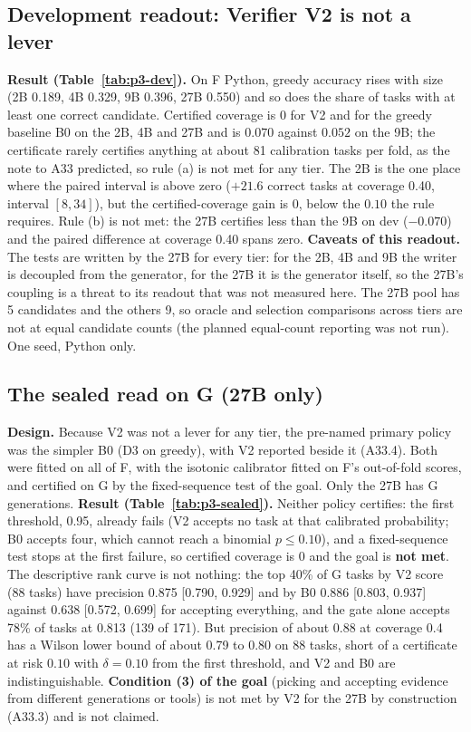 \documentclass[11pt,a4paper]{article}
\newcommand{\code}[1]{\texttt{\detokenize{#1}}}
\begin{document}
\subsection{Development readout: Verifier V2 is not a lever}\label{sec:p3-dev}



\textbf{Result (Table~\ref{tab:p3-dev}).} On F Python, greedy accuracy rises with size (2B 0.189, 4B 0.329, 9B 0.396, 27B 0.550) and so does the share of tasks with at least one correct candidate. Certified coverage is $0$ for V2 and for the greedy baseline B0 on the 2B, 4B and 27B and is $0.070$ against $0.052$ on the 9B; the certificate rarely certifies anything at about 81 calibration tasks per fold, as the note to A33 predicted, so rule (a) is not met for any tier. The 2B is the one place where the paired interval is above zero ($+21.6$ correct tasks at coverage 0.40, interval $[8, 34]$), but the certified-coverage gain is $0$, below the $0.10$ the rule requires. Rule (b) is not met: the 27B certifies less than the 9B on dev ($-0.070$) and the paired difference at coverage 0.40 spans zero. \textbf{Caveats of this readout.} The tests are written by the 27B for every tier: for the 2B, 4B and 9B the writer is decoupled from the generator, for the 27B it is the generator itself, so the 27B's coupling is a threat to its readout that was not measured here. The 27B pool has 5 candidates and the others 9, so oracle and selection comparisons across tiers are not at equal candidate counts (the planned equal-count reporting was not run). One seed, Python only.

\subsection{The sealed read on G (27B only)}\label{sec:p3-sealed}

\textbf{Design.} Because V2 was not a lever for any tier, the pre-named primary policy was the simpler B0 (D3 \code{lr|core} on greedy), with V2 reported beside it (A33.4). Both were fitted on all of F, with the isotonic calibrator fitted on F's out-of-fold scores, and certified on G by the fixed-sequence test of the goal. Only the 27B has G generations. \textbf{Result (Table~\ref{tab:p3-sealed}).} Neither policy certifies: the first threshold, 0.95, already fails (V2 accepts no task at that calibrated probability; B0 accepts four, which cannot reach a binomial $p\le0.10$), and a fixed-sequence test stops at the first failure, so certified coverage is $0$ and the goal is \textbf{not met}. The descriptive rank curve is not nothing: the top 40\% of G tasks by V2 score (88 tasks) have precision 0.875 [0.790, 0.929] and by B0 0.886 [0.803, 0.937] against 0.638 [0.572, 0.699] for accepting everything, and the gate alone accepts 78\% of tasks at 0.813 (139 of 171). But precision of about 0.88 at coverage 0.4 has a Wilson lower bound of about 0.79 to 0.80 on 88 tasks, short of a certificate at risk $0.10$ with $\delta=0.10$ from the first threshold, and V2 and B0 are indistinguishable. \textbf{Condition (3) of the goal} (picking and accepting evidence from different generations or tools) is not met by V2 for the 27B by construction (A33.3) and is not claimed.
\end{document}
